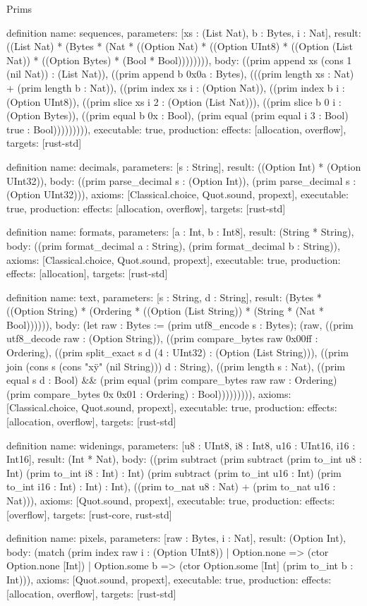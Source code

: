 \begin{lexlean}{Prims}
\begin{semanticmodule}
definition{
  name: sequences,
  parameters: [xs : (List Nat), b : Bytes, i : Nat],
  result: ((List Nat) * (Bytes * (Nat * ((Option Nat) * ((Option UInt8) * ((Option (List Nat)) * ((Option Bytes) * (Bool * Bool)))))))),
  body: ((prim append xs (cons 1 (nil Nat)) : (List Nat)), ((prim append b 0x0a : Bytes), (((prim length xs : Nat) + (prim length b : Nat)), ((prim index xs i : (Option Nat)), ((prim index b i : (Option UInt8)), ((prim slice xs i 2 : (Option (List Nat))), ((prim slice b 0 i : (Option Bytes)), ((prim equal b 0x : Bool), (prim equal (prim equal i 3 : Bool) true : Bool))))))))),
  executable: true,
  production: {effects: [allocation, overflow], targets: [rust-std]}
}

definition{
  name: decimals,
  parameters: [s : String],
  result: ((Option Int) * (Option UInt32)),
  body: ((prim parse_decimal s : (Option Int)), (prim parse_decimal s : (Option UInt32))),
  axioms: [Classical.choice, Quot.sound, propext],
  executable: true,
  production: {effects: [allocation, overflow], targets: [rust-std]}
}

definition{
  name: formats,
  parameters: [a : Int, b : Int8],
  result: (String * String),
  body: ((prim format_decimal a : String), (prim format_decimal b : String)),
  axioms: [Classical.choice, Quot.sound, propext],
  executable: true,
  production: {effects: [allocation], targets: [rust-std]}
}

definition{
  name: text,
  parameters: [s : String, d : String],
  result: (Bytes * ((Option String) * (Ordering * ((Option (List String)) * (String * (Nat * Bool)))))),
  body: (let raw : Bytes := (prim utf8_encode s : Bytes); (raw, ((prim utf8_decode raw : (Option String)), ((prim compare_bytes raw 0x00ff : Ordering), ((prim split_exact s d (4 : UInt32) : (Option (List String))), ((prim join (cons s (cons "x\"y" (nil String))) d : String), ((prim length s : Nat), ((prim equal s d : Bool) && (prim equal (prim compare_bytes raw raw : Ordering) (prim compare_bytes 0x 0x01 : Ordering) : Bool))))))))),
  axioms: [Classical.choice, Quot.sound, propext],
  executable: true,
  production: {effects: [allocation, overflow], targets: [rust-std]}
}

definition{
  name: widenings,
  parameters: [u8 : UInt8, i8 : Int8, u16 : UInt16, i16 : Int16],
  result: (Int * Nat),
  body: ((prim subtract (prim subtract (prim to_int u8 : Int) (prim to_int i8 : Int) : Int) (prim subtract (prim to_int u16 : Int) (prim to_int i16 : Int) : Int) : Int), ((prim to_nat u8 : Nat) + (prim to_nat u16 : Nat))),
  axioms: [Quot.sound, propext],
  executable: true,
  production: {effects: [overflow], targets: [rust-core, rust-std]}
}

definition{
  name: pixels,
  parameters: [raw : Bytes, i : Nat],
  result: (Option Int),
  body: (match (prim index raw i : (Option UInt8))
    | Option.none => (ctor Option.none [Int])
    | Option.some b => (ctor Option.some [Int] (prim to_int b : Int))),
  axioms: [Quot.sound, propext],
  executable: true,
  production: {effects: [allocation, overflow], targets: [rust-std]}
}
\end{semanticmodule}
\end{lexlean}

